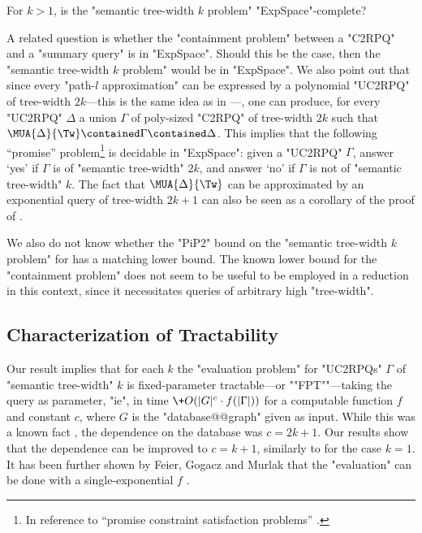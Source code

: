 \begin{question}
    For $k > 1$, is the "semantic tree-width $k$ problem" "ExpSpace"-complete?
\end{question}
A related question is whether the "containment problem" between a "C2RPQ" and a "summary query" is in "ExpSpace". Should this be the case, then the "semantic tree-width $k$ problem" would be in "ExpSpace".
We also point out that since every "path-$l$ approximation" can be expressed by a polynomial "UC2RPQ" of tree-width $2k$---this is the same idea as in \cite[Lemma IV.13]{RomeroBarceloVardi2017Homomorphism}---, one can produce, for every "UC2RPQ" $\Delta$ a union $\Gamma$ of poly-sized "C2RPQ" of tree-width $2k$ such that $ \MUA{\Delta}{\Tw} \contained \Gamma \contained \Delta$. This implies that the following ``promise'' problem\footnote{In reference to ``promise constraint satisfaction problems''
\cite[Definition 2.3]{BrakensiekGuruswami2021PCSP}.} is decidable in "ExpSpace": given a "UC2RPQ" $\Gamma$, answer `yes' if $\Gamma$ is of "semantic tree-width" $2k$, and answer `no' if $\Gamma$ is not of "semantic tree-width" $k$. The fact that $\MUA{\Delta}{\Tw}$ can be approximated by an exponential query of tree-width $2k+1$ can also be seen as a corollary of the proof of \cite[Theorem~V.1]{RomeroBarceloVardi2017Homomorphism}.

We also do not know whether the {"PiP2"} bound on the "semantic tree-width $k$ problem" for {\UCRPQSRE} has a matching lower bound. The known lower bound for the {\UCRPQSRE} "containment problem" \cite[Theorem~5.1]{FigueiraEtal2020Containment} does not seem to be useful to be employed in a reduction in this context, since it necessitates queries of arbitrary high "tree-width".

\subsection{\AP{}Characterization of Tractability}
\label{sec:charact-tractability}

Our result implies that for each $k$
the "evaluation problem" for "UC2RPQs" $\Gamma$
of "semantic tree-width" $k$ is fixed-parameter tractable---or \AP""FPT""---taking
the query as parameter, "ie", in time $\+O(|G|^{c} \cdot f(|\Gamma|))$
for a computable function $f$ and constant $c$, where $G$ is the "database@@graph" given as input.
%
While this was a known fact \cite[Corollary IV.12]{RomeroBarceloVardi2017Homomorphism}, the dependence on the database was $c=2k+1$.  Our results show that the dependence can be improved to $c=k+1$, similarly to \cite[Theorem 6.3]{BarceloRomeroVardi2016SemanticAcyclicity} for the case $k=1$.
It has been further shown by Feier, Gogacz and Murlak that the "evaluation" can be done with a single-exponential $f$ \cite[Theorem~22]{FeierGogaczMurlak24Treewidth}.

